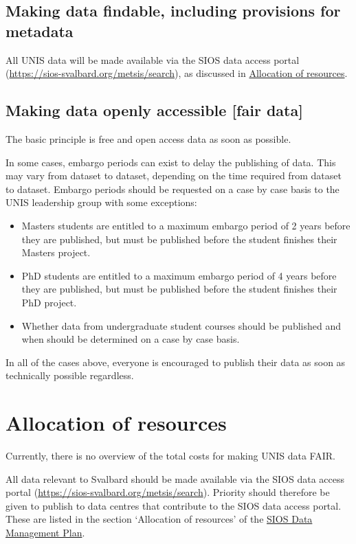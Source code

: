 \documentclass[a4paper,english, 11pt]{article}
\begin{document}
\subsection{Making data findable, including provisions for metadata}
\label{ss:findable}

All UNIS data will be made available via the SIOS data access portal (\url{https://sios-svalbard.org/metsis/search}), as discussed in \href{s:resources}{Allocation of resources}. 

\subsection{Making data openly accessible [fair data]}
\label{ss:accessible}

The basic principle is free and open access data as soon as possible. 

In some cases, embargo periods can exist to delay the publishing of data. This may vary from dataset to dataset, depending on the time required from dataset to dataset. Embargo periods should be requested on a case by case basis to the UNIS leadership group with some exceptions:

 \begin{itemize}
 \item Masters students are entitled to a maximum embargo period of 2 years before they are published, but must be published before the student finishes their Masters project. 
 \item PhD students are entitled to a maximum embargo period of 4 years before they are published, but must be published before the student finishes their PhD project.
 \item Whether data from undergraduate student courses should be published and when should be determined on a case by case basis. 
 \end{itemize}

In all of the cases above, everyone is encouraged to publish their data as soon as technically possible regardless.

\section{Allocation of resources}
\label{s:resources}

Currently, there is no overview of the total costs for making UNIS data FAIR. 

All data relevant to Svalbard should be made available via the SIOS data access portal (\url{https://sios-svalbard.org/metsis/search}). Priority should therefore be given to publish to data centres that contribute to the SIOS data access portal. These are listed in the section `Allocation of resources' of the \href{https://sios-svalbard.org/sites/sios-svalbard.org/files/common/SIOS_Data_Management_Plan.pdf}{SIOS Data Management Plan}.
\end{document}
